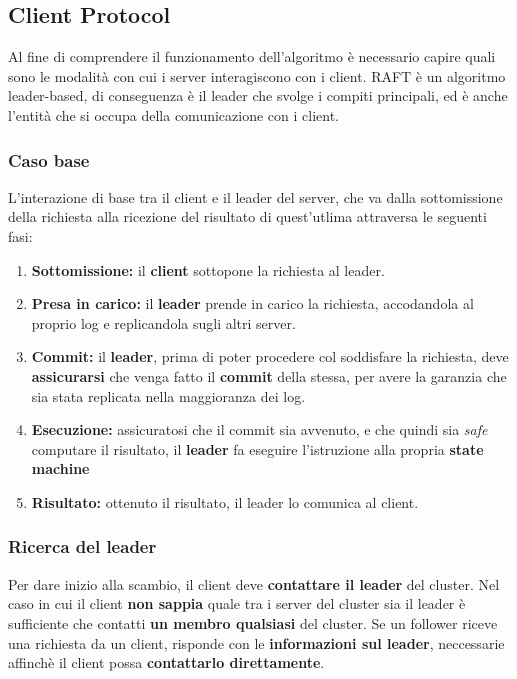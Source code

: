 \subsection{Client Protocol}

Al fine di comprendere il funzionamento dell'algoritmo è necessario capire quali sono le modalità con cui i server interagiscono con i client.
RAFT è un algoritmo leader-based, di conseguenza è il leader che svolge i compiti principali, ed è anche l'entità che si occupa della comunicazione con i client.

	\subsubsection{Caso base}
	L'interazione di base tra il client e il leader del server, che va dalla sottomissione della richiesta alla ricezione del risultato di quest'utlima attraversa le seguenti fasi:

	\begin{enumerate}
		\item{\textbf{Sottomissione:}} il \textbf{client} sottopone la richiesta al leader.

		\item{\textbf{Presa in carico:}} il \textbf{leader} prende in carico la richiesta, accodandola al proprio log e replicandola sugli altri server.

		\item{\textbf{Commit:}} il \textbf{leader}, prima di poter procedere col soddisfare la richiesta, deve \textbf{assicurarsi} che venga fatto il \textbf{commit} della stessa, per avere la garanzia che sia stata replicata nella maggioranza dei log. 

		\item{\textbf{Esecuzione:}} assicuratosi che il commit sia avvenuto, e che quindi sia \textit{safe} computare il risultato, il \textbf{leader} fa eseguire l'istruzione alla propria \textbf{state machine}

		\item{\textbf{Risultato:}} ottenuto il risultato, il leader lo comunica al client.

	\end{enumerate}

	
	\subsubsection{Ricerca del leader}
	Per dare inizio alla scambio, il client deve \textbf{contattare il leader} del cluster. Nel caso in cui il client \textbf{non sappia} quale tra i server del cluster sia il leader è sufficiente che contatti \textbf{un membro qualsiasi} del cluster.
	Se un follower riceve una richiesta da un client, risponde con le \textbf{informazioni sul leader}, neccessarie affinchè il client possa \textbf{contattarlo direttamente}. 


